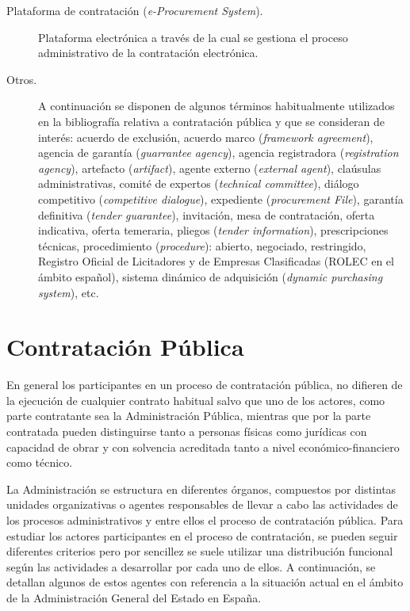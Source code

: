 \begin{description}
\item [Plataforma de contratación (\textit{e-Procurement System}).] Plataforma electrónica a través de la cual se gestiona
el proceso administrativo de la contratación electrónica.

\item [Otros.] A continuación se disponen de algunos términos habitualmente utilizados
en la bibliografía relativa a contratación pública y que se consideran de interés:
acuerdo de exclusión, acuerdo marco (\textit{framework agreement}), 
agencia de garantía (\textit{guarrantee agency}), agencia registradora (\textit{registration agency}), 
artefacto (\textit{artifact}), agente externo (\textit{external agent}),
claúsulas administrativas, comité de expertos (\textit{technical committee}), 
diálogo competitivo (\textit{competitive dialogue}), expediente (\textit{procurement File}), 
garantía definitiva (\textit{tender guarantee}), invitación, mesa de contratación,
oferta indicativa, oferta temeraria, pliegos (\textit{tender information}), prescripciones técnicas,
procedimiento (\textit{procedure}): abierto, negociado, restringido, Registro Oficial de Licitadores y de Empresas Clasificadas (\gls{ROLEC} en el ámbito español), sistema dinámico de adquisición 
(\textit{dynamic purchasing system}), etc.
\end{description}

\section{Contratación Pública}
En general los participantes en un proceso de contratación pública, no difieren de la ejecución
de cualquier contrato habitual salvo que uno de los actores, como parte contratante sea la Administración Pública, 
mientras que por la parte contratada pueden distinguirse tanto a personas físicas como jurídicas con capacidad de obrar y con solvencia acreditada tanto
a nivel económico-financiero como técnico.

La Administración se estructura en diferentes órganos, compuestos por distintas unidades organizativas o 
agentes responsables de llevar a cabo las actividades de los procesos administrativos y entre ellos
el proceso de contratación pública. Para estudiar los actores participantes en el proceso de contratación, se pueden seguir diferentes criterios pero por sencillez se suele utilizar una distribución funcional
según las actividades a desarrollar por cada uno de ellos. A continuación, se detallan algunos de estos
agentes con referencia a la situación actual en el ámbito de la Administración General del Estado
en España.

